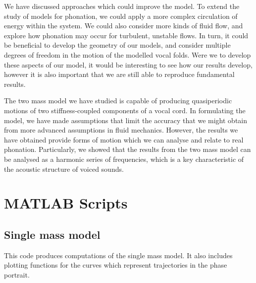 \documentclass{report}
\begin{document}
We have discussed approaches which could improve the model.
To extend the study of models for phonation, we could apply a more complex circulation of energy within the system.
We could also consider more kinds of fluid flow,
and explore how phonation may occur for turbulent, unstable flows.
In turn, it could be beneficial to develop the geometry of our models,
and consider multiple degrees of freedom in the motion of the modelled vocal folds.
Were we to develop these aspects of our model,
it would be interesting to see how our results develop,
however it is also important that we are still able to reproduce fundamental results.

The two mass model we have studied is capable of producing quasiperiodic motions of two stiffness-coupled components of a vocal cord.
In formulating the model,
we have made assumptions that limit the accuracy that we might obtain from more advanced assumptions in fluid mechanics.
However, the results we have obtained provide forms of motion which we can analyse and relate to real phonation.
Particularly, we showed that the results from the two mass model can be analysed as a harmonic series of frequencies,
which is a key characteristic of the acoustic structure of voiced sounds.




\appendix


\chapter{MATLAB Scripts}

\section{Single mass model}

This code produces computations of the single mass model.
It also includes plotting functions for the curves which represent trajectories in the phase portrait.
\end{document}
